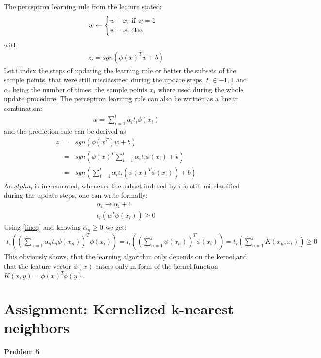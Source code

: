 \documentclass{article}
\begin{document}
The perceptron learning rule from the lecture stated:
\begin{eqnarray}
w \leftarrow 
\begin{cases}
w + x_i $ if $ z_i  = 1 \\
w - x_i $ else$
\end{cases}
\end{eqnarray}
with
\begin{eqnarray}
z_i = sgn(\phi(x)^Tw +b)
\end{eqnarray}
Let i index the steps of updating the learning rule or better the subsets of the sample points, that were still misclassified during the update steps, $t_i \in {-1,1}$ and $\alpha_i$ being the number of times, the sample points $x_i$ where used during the whole update procedure. The perceptron learning rule can also be written as a linear combination:
\begin{eqnarray}
w = \sum_{i=1}^{l} \alpha_i t_i \phi(x_i)
\label{lineq}
\end{eqnarray}
and the prediction rule can be derived as 
\begin{eqnarray}
z &=& sgn(\phi(x^T) w+b)\\
&=& sgn(\phi(x)^T \sum_{i=1}^{l} \alpha_i t_i \phi(x_i) +b)\\
&=& sgn(\sum_{i=1}^{l} \alpha_i t_i (\phi(x)^T \phi(x_i)) +b)
\end{eqnarray}
As $alpha_i$ is incremented, whenever the subset indexed by $i$ is still misclassified during the update steps, one can write formally:
\begin{eqnarray}
\alpha_i \rightarrow \alpha_i +1\\
t_i (w^T \phi(x_i)) \geq 0 
\end{eqnarray}
Using \ref{lineq} and knowing $\alpha_n \geq 0$ we get:
\begin{eqnarray}
t_i \left( \left( \sum_{n=1}^{l} \alpha_n t_n \phi(x_n)\right)^T \phi(x_i) \right) = 
t_i \left( \left( \sum_{n=1}^{l} \phi(x_n)\right)^T \phi(x_i)\right) =
t_i\left(\sum_{n=1}^{l} K(x_n,x_i)\right) \geq 0 
\end{eqnarray}
This obviously shows, that the learning algorithm only depends on the kernel,and  that the feature vector $\phi(x)$ enters only in form of the kernel function $K(x,y) = \phi(x)^T\phi(y)$.


\section{Assignment: Kernelized k-nearest neighbors}
\paragraph*{Problem 5}
$\;$ 
\end{document}
